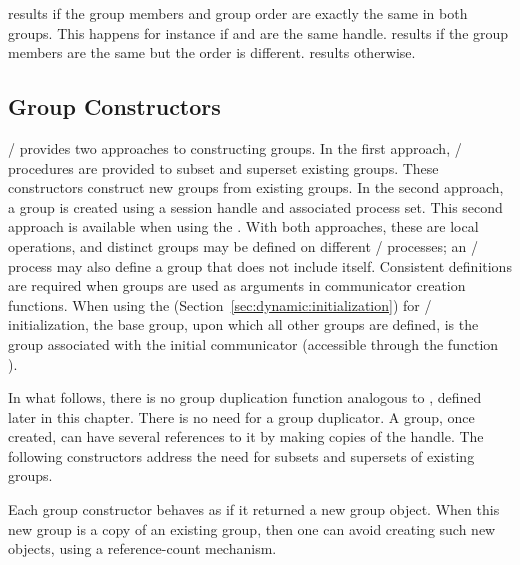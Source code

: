 \noindent{} results if the group members and group order are
exactly the same in both groups. This happens for instance if
 and  are the same handle.
 results if the group members are the same but the order is
different.  results otherwise.

\subsection{Group Constructors}
\label{subsec:context-grpconst}
\MPI/ provides two approaches to constructing groups.
In the first approach, \MPI/ procedures are provided
to subset and superset existing groups.
These constructors construct new groups from existing groups.
In the second approach, a group is created using a session handle and associated
process set. This second approach is available when using the \spm{}%
\mpitermindex{\spm}.
With both approaches, these are local operations, and distinct groups may be defined on
different \MPI/ processes; an \MPI/ process may also define a group that does not
include itself. Consistent definitions are required when groups are
used as arguments in communicator creation functions.
When using the \wpm{} (Section~\ref{sec:dynamic:initialization}) for \MPI/ initialization\mpitermindex{\wpm},
the base group, upon which all
other groups are defined, is the group associated with the initial
communicator  (accessible through
the function ).

\begin{rationale}
In what follows, there is no group duplication function analogous to
, defined later in this chapter. There is no need for
a group duplicator. A group, once created, can have several references to it
by making copies of the handle. The following constructors address the need
for subsets and supersets of existing groups.
\end{rationale}

\begin{implementors}
Each group constructor behaves as if it returned a new group object.
When this new group is a copy of an existing group, then
one can avoid creating such new objects, using
a reference-count mechanism.
\end{implementors}

